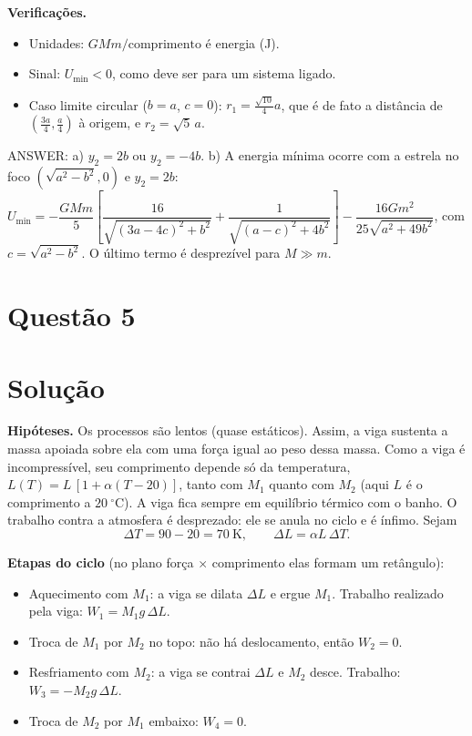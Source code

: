 \documentclass{article}%
\begin{document}
\textbf{Verificações.}
\begin{itemize}
\item Unidades: $GMm/\text{comprimento}$ é energia (J).
\item Sinal: $U_{\min}<0$, como deve ser para um sistema ligado.
\item Caso limite circular ($b=a$, $c=0$): $r_1=\frac{\sqrt{10}}{4}a$, que é de fato a distância de $\left(\frac{3a}{4},\frac a4\right)$ à origem, e $r_2=\sqrt5\,a$.
\end{itemize}

ANSWER: a) $y_2=2b$ ou $y_2=-4b$. b) A energia mínima ocorre com a estrela no foco $(\sqrt{a^2-b^2},0)$ e $y_2=2b$: $U_{\min}=-\dfrac{GMm}{5}\left[\dfrac{16}{\sqrt{(3a-4c)^2+b^2}}+\dfrac{1}{\sqrt{(a-c)^2+4b^2}}\right]-\dfrac{16Gm^2}{25\sqrt{a^2+49b^2}}$, com $c=\sqrt{a^2-b^2}$. O último termo é desprezível para $M\gg m$.%
\newpage%
\section*{Questão 5}

\section*{Solução}

\textbf{Hipóteses.} Os processos são lentos (quase estáticos). Assim, a viga sustenta a massa apoiada sobre ela com uma força igual ao peso dessa massa. Como a viga é incompressível, seu comprimento depende só da temperatura, $L(T)=L\,[1+\alpha(T-20)]$, tanto com $M_1$ quanto com $M_2$ (aqui $L$ é o comprimento a $20\ ^\circ$C). A viga fica sempre em equilíbrio térmico com o banho. O trabalho contra a atmosfera é desprezado: ele se anula no ciclo e é ínfimo. Sejam
\[
\Delta T = 90-20 = 70\ \text{K}, \qquad \Delta L = \alpha L\,\Delta T .
\]

\textbf{Etapas do ciclo} (no plano força $\times$ comprimento elas formam um retângulo):
\begin{itemize}
\item[1.] Aquecimento com $M_1$: a viga se dilata $\Delta L$ e ergue $M_1$. Trabalho realizado pela viga: $W_1 = M_1 g\,\Delta L$.
\item[2.] Troca de $M_1$ por $M_2$ no topo: não há deslocamento, então $W_2=0$.
\item[3.] Resfriamento com $M_2$: a viga se contrai $\Delta L$ e $M_2$ desce. Trabalho: $W_3=-M_2 g\,\Delta L$.
\item[4.] Troca de $M_2$ por $M_1$ embaixo: $W_4=0$.
\end{itemize}
\end{document}
